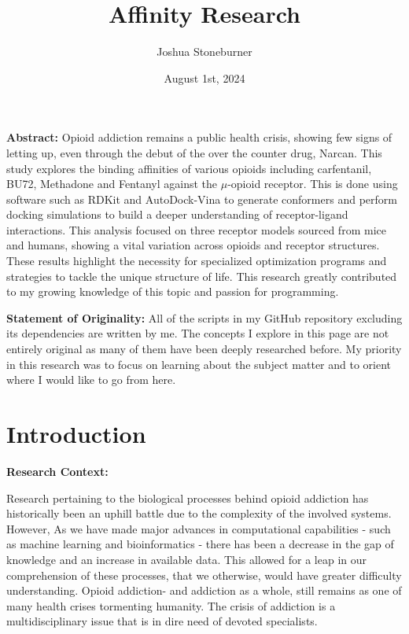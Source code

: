 \documentclass[a4paper,10pt]{article}
\title{Affinity Research}
\author{Joshua Stoneburner}
\date{August 1st, 2024}
\begin{document}
\maketitle    

\normalsize \textbf{Abstract:}
Opioid addiction remains a public health crisis, showing few signs of letting up, even through the debut of the over the counter drug, Narcan. This study explores the binding affinities of various opioids including carfentanil, BU72, Methadone and Fentanyl against the $\mu$-opioid receptor. This is done using software such as RDKit and AutoDock-Vina to generate conformers and perform docking simulations to build a deeper understanding of receptor-ligand interactions. This analysis focused on three receptor models sourced from mice and humans, showing a vital variation across opioids and receptor structures. These results highlight the necessity for specialized optimization programs and strategies to tackle the unique structure of life. This research greatly contributed to my growing knowledge of this topic and passion for programming. 

\normalsize \textbf{Statement of Originality:}
All of the scripts in my GitHub repository excluding its dependencies are written by me. The concepts I explore in this page are not entirely original as many of them have been deeply researched before. My priority in this research was to focus on learning about the subject matter and to orient where I would like to go from here.

\section{Introduction}
\small
\textbf{Research Context:}

Research pertaining to the biological processes behind opioid addiction has historically been an uphill battle due to the complexity of the involved systems. However, As we have made major advances in computational capabilities - such as machine learning and bioinformatics - there has been a decrease in the gap of knowledge and an increase in available data. This allowed for a leap in our comprehension of these processes, that we otherwise, would have greater difficulty understanding. 
Opioid addiction- and addiction as a whole, still remains as one of many health crises tormenting humanity. The crisis of addiction is a multidisciplinary issue that is in dire need of devoted specialists. 
\end{document}
